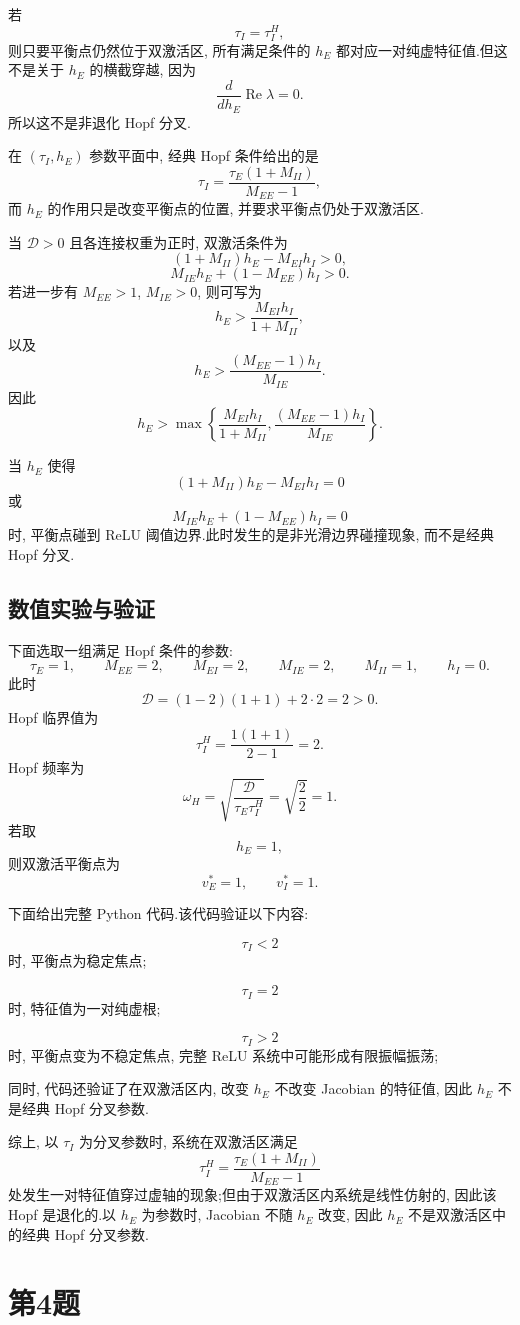 ﻿\documentclass[UTF8,  zihao=-4]{ctexart}
\begin{document}
若
\[
\tau_I=\tau_I^H,  
\]
则只要平衡点仍然位于双激活区,  所有满足条件的 \(h_E\) 都对应一对纯虚特征值.但这不是关于 \(h_E\) 的横截穿越,  因为
\[
\frac{d}{dh_E}\operatorname{Re}\lambda=0.
\]
所以这不是非退化 Hopf 分叉.

在 \((\tau_I,  h_E)\) 参数平面中,  经典 Hopf 条件给出的是
\[
\tau_I
=
\frac{\tau_E(1+M_{II})}{M_{EE}-1},  
\]
而 \(h_E\) 的作用只是改变平衡点的位置,  并要求平衡点仍处于双激活区.

当 \(\mathcal D>0\) 且各连接权重为正时,  双激活条件为
\[
(1+M_{II})h_E-M_{EI}h_I>0,  
\]
\[
M_{IE}h_E+(1-M_{EE})h_I>0.
\]
若进一步有 \(M_{EE}>1\),  \(M_{IE}>0\),  则可写为
\[
h_E>
\frac{M_{EI}h_I}{1+M_{II}},  
\]
以及
\[
h_E>
\frac{(M_{EE}-1)h_I}{M_{IE}}.
\]
因此
\[
h_E>
\max\left\{
\frac{M_{EI}h_I}{1+M_{II}},  
\frac{(M_{EE}-1)h_I}{M_{IE}}
\right\}.
\]

当 \(h_E\) 使得
\[
(1+M_{II})h_E-M_{EI}h_I=0
\]
或
\[
M_{IE}h_E+(1-M_{EE})h_I=0
\]
时,  平衡点碰到 ReLU 阈值边界.此时发生的是非光滑边界碰撞现象,  而不是经典 Hopf 分叉.

\subsection{数值实验与验证}

下面选取一组满足 Hopf 条件的参数:
\[
\tau_E=1,  
\qquad
M_{EE}=2,  
\qquad
M_{EI}=2,  
\qquad
M_{IE}=2,  
\qquad
M_{II}=1,  
\qquad
h_I=0.
\]
此时
\[
\mathcal D
=
(1-2)(1+1)+2\cdot 2
=
2>0.
\]
Hopf 临界值为
\[
\tau_I^H
=
\frac{1(1+1)}{2-1}
=
2.
\]
Hopf 频率为
\[
\omega_H
=
\sqrt{\frac{\mathcal D}{\tau_E\tau_I^H}}
=
\sqrt{\frac{2}{2}}
=
1.
\]
若取
\[
h_E=1,  
\]
则双激活平衡点为
\[
v_E^*=1,  
\qquad
v_I^*=1.
\]

下面给出完整 Python 代码.该代码验证以下内容:

\[
\tau_I<2
\]
时,  平衡点为稳定焦点;

\[
\tau_I=2
\]
时,  特征值为一对纯虚根;

\[
\tau_I>2
\]
时,  平衡点变为不稳定焦点,  完整 ReLU 系统中可能形成有限振幅振荡;

同时,  代码还验证了在双激活区内,  改变 \(h_E\) 不改变 Jacobian 的特征值,  因此 \(h_E\) 不是经典 Hopf 分叉参数.


综上,  以 \(\tau_I\) 为分叉参数时,  系统在双激活区满足
\[
\tau_I^H
=
\frac{\tau_E(1+M_{II})}{M_{EE}-1}
\]
处发生一对特征值穿过虚轴的现象;但由于双激活区内系统是线性仿射的,  因此该 Hopf 是退化的.以 \(h_E\) 为参数时,  Jacobian 不随 \(h_E\) 改变,  因此 \(h_E\) 不是双激活区中的经典 Hopf 分叉参数.
\fi
\section{第4题}
\end{document}
